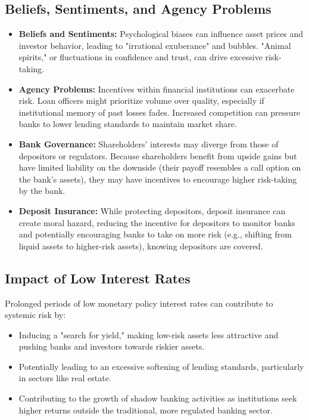 \subsection{Beliefs, Sentiments, and Agency Problems}
\begin{itemize}
    \item \textbf{Beliefs and Sentiments:} Psychological biases can influence asset prices and investor behavior, leading to "irrational exuberance" and bubbles. "Animal spirits," or fluctuations in confidence and trust, can drive excessive risk-taking.
    \item \textbf{Agency Problems:} Incentives within financial institutions can exacerbate risk. Loan officers might prioritize volume over quality, especially if institutional memory of past losses fades. Increased competition can pressure banks to lower lending standards to maintain market share.
    \item \textbf{Bank Governance:} Shareholders' interests may diverge from those of depositors or regulators. Because shareholders benefit from upside gains but have limited liability on the downside (their payoff resembles a call option on the bank's assets), they may have incentives to encourage higher risk-taking by the bank.
    \item \textbf{Deposit Insurance:} While protecting depositors, deposit insurance can create moral hazard, reducing the incentive for depositors to monitor banks and potentially encouraging banks to take on more risk (e.g., shifting from liquid assets to higher-risk assets), knowing depositors are covered.
\end{itemize}

\subsection{Impact of Low Interest Rates}
Prolonged periods of low monetary policy interest rates can contribute to systemic risk by:
\begin{itemize}
    \item Inducing a "search for yield," making low-risk assets less attractive and pushing banks and investors towards riskier assets.
    \item Potentially leading to an excessive softening of lending standards, particularly in sectors like real estate.
    \item Contributing to the growth of shadow banking activities as institutions seek higher returns outside the traditional, more regulated banking sector.
\end{itemize}

